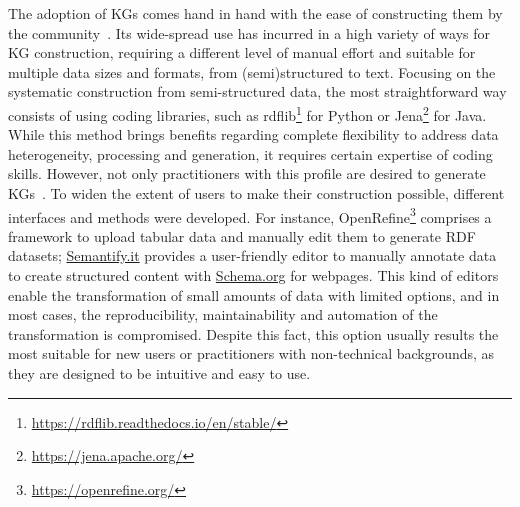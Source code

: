The adoption of KGs comes hand in hand with the ease of constructing them by the community~\parencite{hogan2020twodecades,karger2014semantic}. Its wide-spread use has incurred in a high variety of ways for KG construction, requiring a different level of manual effort and suitable for multiple data sizes and formats, from (semi)structured to text. Focusing on the systematic construction from semi-structured data, the most straightforward way consists of using coding libraries, such as rdflib\footnote{\url{https://rdflib.readthedocs.io/en/stable/}} for Python or Jena\footnote{\url{https://jena.apache.org/}} for Java. While this method brings benefits regarding complete flexibility to address data heterogeneity, processing and generation, it requires certain expertise of coding skills. However, not only practitioners with this profile are desired to generate KGs~\parencite{karger2014semantic}. To widen the extent of users to make their construction possible, different interfaces and methods were developed. For instance, OpenRefine\footnote{\url{https://openrefine.org/}} comprises a framework to upload tabular data and manually edit them to generate RDF datasets; \url{Semantify.it} provides a user-friendly editor to manually annotate data to create structured content with \url{Schema.org} for webpages. This kind of editors enable the transformation of small amounts of data with limited options, and in most cases, the reproducibility, maintainability and automation of the transformation is compromised. Despite this fact, this option usually results the most suitable for new users or practitioners with non-technical backgrounds, as they are designed to be intuitive and easy to use. 


